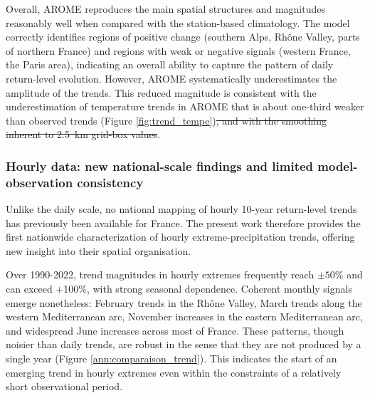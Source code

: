 ﻿\documentclass[hess, manuscript]{copernicus}
\providecommand{\DIFdel}[1]{{\protect\color{red}\sout{#1}}} %
\providecommand{\DIFdelbegin}{} %
\providecommand{\DIFdelend}{} %
\begin{document}
Overall, AROME reproduces the main spatial structures and magnitudes reasonably well when compared with the station-based climatology. The model correctly identifies regions of positive change (southern Alps, Rhône Valley, parts of northern France) and regions with weak or negative signals (western France, the Paris area), indicating an overall ability to capture the pattern of daily return-level evolution. However, AROME systematically underestimates the amplitude of the trends. This reduced magnitude is consistent with the underestimation of temperature trends in AROME that is about one-third weaker than observed trends (Figure \ref{fig:trend_tempe})\DIFdelbegin \DIFdel{, and with the smoothing inherent to 2.5~km grid-box values}\DIFdelend .

\subsubsection{Hourly data: new national-scale findings and limited model-observation consistency}

Unlike the daily scale, no national mapping of hourly 10-year return-level trends has previously been available for France. The present work therefore provides the first nationwide characterization of hourly extreme-precipitation trends, offering new insight into their spatial organisation.

\DIFdelbegin %

\DIFdelend Over 1990-2022, trend magnitudes in hourly extremes frequently reach $\pm 50\%$ and can exceed +100\%, with strong seasonal dependence. Coherent monthly signals emerge nonetheless: February trends in the Rhône Valley, March trends along the western Mediterranean arc, November increases in the eastern Mediterranean arc, and widespread June increases across most of France. These patterns, though noisier than daily trends, are robust in the sense that they are not produced by a single year (Figure \ref{ann:comparaison_trend}). This indicates the start of an emerging trend in hourly extremes even within the constraints of a relatively short observational period.
\end{document}

